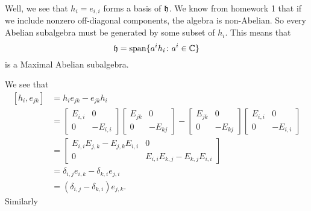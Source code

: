 \answer{} Well, we see
that $h_{i}=e_{i,i}$ forms a basis of $\frak{h}$. We know from
homework 1 that if we include nonzero off-diagonal components,
the algebra is non-Abelian. So every Abelian subalgebra must be
generated by some subset of $h_{i}$. This means that
\begin{equation}
\frak{h}={\rm span}\{a^{i}h_{i}\colon a^{i}\in\Bbb{C}\}
\end{equation}
is a Maximal Abelian subalgebra.

We see that
\begin{subequations}
\begin{align}
[h_{i},e_{jk}]&=h_{i}e_{jk}-e_{jk}h_{i}\\
&=\begin{bmatrix}
E_{i,i}&0\\
0     &-E_{i,i}
\end{bmatrix}
\begin{bmatrix}E_{jk}&0\\
0&-E_{kj}
\end{bmatrix}
-\begin{bmatrix}E_{jk}&0\\
0&-E_{kj}
\end{bmatrix}
\begin{bmatrix}
E_{i,i}&0\\
0     &-E_{i,i}
\end{bmatrix}\\
&=\begin{bmatrix}
E_{i,i}E_{j,k} - E_{j,k}E_{i,i} & 0\\
0 & E_{i,i}E_{k,j}-E_{k,j}E_{i,i}
\end{bmatrix}\\
&=\delta_{i,j}e_{i,k}-\delta_{k,i}e_{j,i}\\
&=(\delta_{i,j}-\delta_{k,i})e_{j,k}.
\end{align}
\end{subequations}
Similarly
